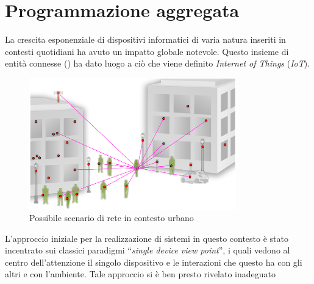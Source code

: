 \chapter{Programmazione aggregata}

La crescita esponenziale di dispositivi informatici di varia natura inseriti in contesti quotidiani ha avuto un impatto globale notevole.
Questo insieme di entità connesse () ha dato luogo a ciò che viene definito \emph{Internet of Things} (\emph{IoT}).

\begin{figure}
  \centering
  \includegraphics[width=0.8\textwidth]{res/fig/iot.eps}%
  \caption{Possibile scenario di rete in contesto urbano~\cite{7274429}}%
  \label{fig:iot}
\end{figure}

L'approccio iniziale per la realizzazione di sistemi in questo contesto è stato incentrato sui classici paradigmi ``\emph{single device view point}'',
i quali vedono al centro dell'attenzione il singolo dispositivo e le interazioni che questo ha con gli altri e con l'ambiente.
Tale approccio si è ben presto rivelato inadeguato %

